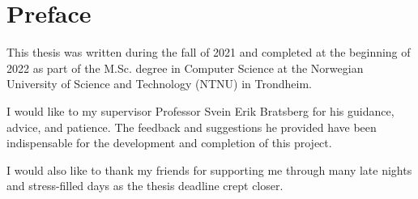 \chapter*{Preface}

This thesis was written during the fall of 2021 and completed at the beginning of 2022 as part of the M.Sc. degree in Computer Science at the Norwegian University of Science and Technology (NTNU) in Trondheim. 

I would like to my supervisor Professor Svein Erik Bratsberg for his guidance, advice, and patience. The feedback and suggestions he provided have been indispensable for the development and completion of this project. 

I would also like to thank my friends for supporting me through many late nights and stress-filled days as the thesis deadline crept closer. 
